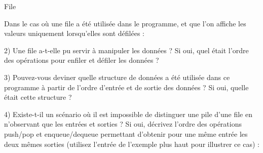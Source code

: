 \documentclass[11pt,a4paper]{article}
\begin{document}
\begin{center}
\begin{table}[ht!]
\begin{minipage}{0.01\textwidth}

  \end{minipage}
  \hfillx
  \begin{minipage}{0.45\textwidth}
    \centering
File

Dans le cas où une file a été utilisée dans le programme, et que l'on affiche les valeurs uniquement lorsqu'elles sont défilées :

\smallskip

\raggedright
2) Une file a-t-elle pu servir à manipuler les données ?
Si oui, quel était l'ordre des opérations pour enfiler et défiler les données ? \phantom{blablabla}

\vspace*{4cm}

  \end{minipage}
\end{table}

\end{center}


3) Pouvez-vous deviner quelle structure de données a été utilisée dans ce programme à partir de l'ordre d'entrée et de sortie des données ?
Si oui, quelle était cette structure ?


\vspace*{1.5cm}


4) Existe-t-il un scénario où il est impossible de distinguer une pile d'une file en n'observant que les entrées et sorties ?
Si oui, décrivez l'ordre des opérations push/pop et enqueue/dequeue permettant d'obtenir pour une même entrée les deux mêmes sorties (utilisez l'entrée de l'exemple plus haut pour illustrer ce cas) :
\end{document}
